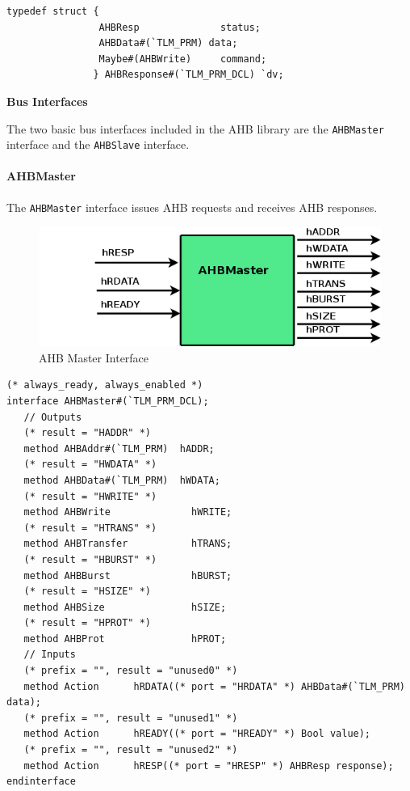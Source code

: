 \documentclass[twoside,letterpaper]{article}
\newcommand{\te}[1]{\texttt{#1}}
\begin{document}
\begin{verbatim}
typedef struct {
                AHBResp              status;
                AHBData#(`TLM_PRM) data;
                Maybe#(AHBWrite)     command;
               } AHBResponse#(`TLM_PRM_DCL) `dv;
\end{verbatim}

{\bf Bus Interfaces}

The two basic bus interfaces included in the AHB library are the
\te{AHBMaster} interface and the \te{AHBSlave} interface.


\paragraph{\bf AHBMaster} The \te{AHBMaster} interface issues AHB requests 
and receives AHB responses. 

\begin{figure}[ht]
\begin{center}
\includegraphics[height = 1 in]{AHBMasterIFC}
\caption{AHB Master Interface}
\label{AHBMaster}
\end{center}
\end{figure}


\begin{verbatim}
(* always_ready, always_enabled *)
interface AHBMaster#(`TLM_PRM_DCL);
   // Outputs
   (* result = "HADDR" *)
   method AHBAddr#(`TLM_PRM)  hADDR;
   (* result = "HWDATA" *)
   method AHBData#(`TLM_PRM)  hWDATA;
   (* result = "HWRITE" *)
   method AHBWrite              hWRITE;
   (* result = "HTRANS" *)
   method AHBTransfer           hTRANS;
   (* result = "HBURST" *)
   method AHBBurst              hBURST;
   (* result = "HSIZE" *)
   method AHBSize               hSIZE;
   (* result = "HPROT" *)
   method AHBProt               hPROT;
   // Inputs
   (* prefix = "", result = "unused0" *)
   method Action      hRDATA((* port = "HRDATA" *) AHBData#(`TLM_PRM) data);
   (* prefix = "", result = "unused1" *)
   method Action      hREADY((* port = "HREADY" *) Bool value);
   (* prefix = "", result = "unused2" *)
   method Action      hRESP((* port = "HRESP" *) AHBResp response);
endinterface
\end{verbatim}
\end{document}
